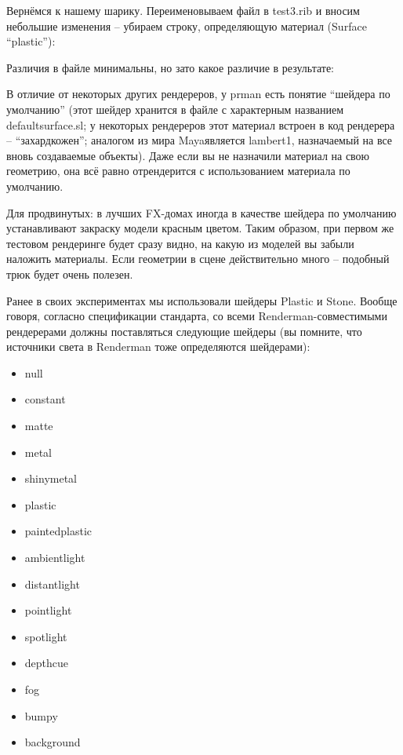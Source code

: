  Вернёмся к нашему шарику. Переименовываем файл в
    test3.rib и вносим небольшие изменения – убираем строку,
    определяющую материал (Surface “plastic”):
  


 Различия в файле минимальны, но зато какое различие
    в результате:
  

  

 В отличие от некоторых других рендереров, у prman
    есть понятие “шейдера по умолчанию” (этот шейдер хранится в файле с
    характерным названием defaultsurface.sl; у
    некоторых рендереров этот материал встроен в код рендерера –
    “захардкожен”; аналогом из мира Mayaявляется
    lambert1, назначаемый на все вновь создаваемые объекты). Даже если
    вы не назначили материал на свою геометрию, она всё равно
    отрендерится с использованием материала по умолчанию.
  

 Для
    продвинутых: в лучших FX-домах
    иногда в качестве шейдера по умолчанию устанавливают закраску
    модели красным цветом. Таким образом, при первом же тестовом
    рендеринге будет сразу видно, на какую из моделей вы забыли
    наложить материалы. Если геометрии в сцене действительно много – подобный
    трюк будет очень полезен.
  

 Ранее в своих экспериментах мы использовали шейдеры
    Plastic и Stone. Вообще говоря, согласно спецификации стандарта, со
    всеми Renderman-совместимыми рендерерами должны поставляться
    следующие шейдеры (вы помните, что источники света в Renderman тоже
    определяются шейдерами):
  
\begin{itemize}
	\item null
	\item constant
	\item      matte
	\item      metal
	\item      shinymetal
	\item      plastic
	\item      paintedplastic
	\item      ambientlight
	\item      distantlight
	\item      pointlight
	\item      spotlight
	\item      depthcue
	\item      fog
	\item      bumpy
	\item      background
\end{itemize}

